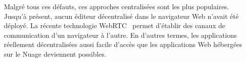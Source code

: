 Malgré tous ces défauts, ces approches centralisées sont les plus populaires.
Jusqu'à présent, aucun éditeur décentralisé dans le navigateur Web n'avait été
déployé. La récente technologie WebRTC~\cite{webrtc} permet d'établir des canaux
de communication d'un navigateur à l'autre. En d'autres termes, les applications
réellement décentralisées aussi facile d'accès que les applications Web
hébergées sur le Nuage deviennent possibles.


 



